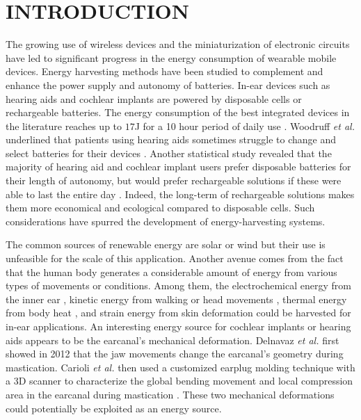 \documentclass[3p,twocolumn,preprint]{elsarticle}
\begin{document}
\section{INTRODUCTION}
\label{INTRODUCTION}
The growing use of wireless devices and the miniaturization of electronic circuits have led to significant progress in the energy consumption of wearable mobile devices. Energy harvesting methods have been studied to complement and enhance the power supply and autonomy of batteries. In-ear devices such as hearing aids and cochlear implants are powered by disposable cells or rechargeable batteries. The energy consumption of the best integrated devices in the literature reaches up to $17$J for a 10 hour period of daily use \cite{Scherer2019,Yip2015,Kulah2022}. Woodruff \emph{et al.} underlined that patients using hearing aids sometimes struggle to change and select batteries for their devices \cite{Woodruff2021}. Another statistical study revealed that the majority of hearing aid and cochlear implant users prefer disposable batteries for their length of autonomy, but would prefer rechargeable solutions if these were able to last the entire day \cite{PracticesAudiology2016}. Indeed, the long-term of rechargeable solutions makes them more economical and ecological compared to disposable cells. Such considerations have spurred the development of energy-harvesting systems.

The common sources of renewable energy are solar or wind but their use is unfeasible for the scale of this application. Another avenue comes from the fact that the human body generates a considerable amount of energy from various types of movements or conditions. Among them, the electrochemical energy from the inner ear \cite{Mercier2012}, kinetic energy from walking or head movements \cite{Azimi2021,Smilek2016}, thermal energy from body heat \cite{Kim2014}, and strain energy from skin deformation \cite{Jin2021} could be harvested for in-ear applications. An interesting energy source for cochlear implants or hearing aids appears to be the earcanal's mechanical deformation. Delnavaz \emph{et al.} first showed in 2012 that the jaw movements change the earcanal's geometry during mastication. Carioli \emph{et al.} then used a customized earplug molding technique with a 3D scanner to characterize the global bending movement and local compression area in the earcanal during mastication \cite{Carioli2016}. These two mechanical deformations could potentially be exploited as an energy source.
\end{document}
